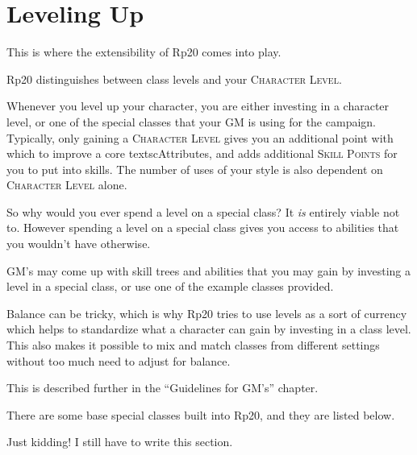 \chapter{Leveling Up}
This is where the extensibility of Rp20 comes into play.

Rp20 distinguishes between class levels and your \textsc{Character Level}.

Whenever you level up your character, you are either investing in a character level, or one of the special classes that your GM is using for the campaign. Typically, only gaining a \textsc{Character Level} gives you an additional point with which to improve a core textsc{Attributes}, and adds additional \textsc{Skill Points} for you to put into skills. The number of uses of your style is also dependent on \textsc{Character Level} alone.

So why would you ever spend a level on a special class? It \emph{is} entirely viable not to. However spending a level on a special class gives you access to abilities that you wouldn't have otherwise.

GM's may come up with skill trees and abilities that you may gain by investing a level in a special class, or use one of the example classes provided.

Balance can be tricky, which is why Rp20 tries to use levels as a sort of currency which helps to standardize what a character can gain by investing in a class level. This also makes it possible to mix and match classes from different settings without too much need to adjust for balance.

This is described further in the ``Guidelines for GM's'' chapter.

There are some base special classes built into Rp20, and they are listed below.

Just kidding! I still have to write this section.

